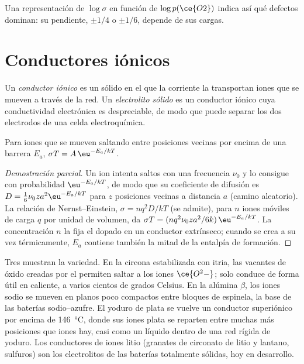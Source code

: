 Una representación de $\log\sigma$ en función de $\log p(\ce{O2})$ indica así qué defectos dominan: su pendiente,
$\pm 1/4$ o $\pm 1/6$, depende de sus cargas.

\section{Conductores iónicos}

\begin{definition}\label{def:b3:solid-state:ionic-conductor}
Un \emph{conductor iónico} es un sólido en el que la corriente
la transportan iones que se mueven a través de la red. Un \emph{electrolito
sólido} es un conductor iónico cuya conductividad electrónica
es despreciable, de modo que puede separar los dos electrodos de una
celda electroquímica.
\end{definition}

\begin{proposition}\label{prop:b3:solid-state:ionic-arrhenius}
Para iones que se mueven saltando entre posiciones vecinas por encima de una barrera $E_a$,
$\sigma T = A\,\eu^{-E_a/kT}$.
\end{proposition}

\begin{proof}[Demostración parcial]
Un ion intenta saltos con una frecuencia $\nu_0$ y lo consigue con probabilidad $\eu^{-E_a/kT}$,
de modo que su coeficiente de difusión es $D = \tfrac16\nu_0 z a^2\eu^{-E_a/kT}$ para $z$ posiciones vecinas a
distancia $a$ (camino aleatorio). La relación de Nernst--Einstein, $\sigma = nq^2D/kT$ (se admite), para $n$
iones móviles de carga $q$ por unidad de volumen, da $\sigma T = (nq^2\nu_0za^2/6k)\,\eu^{-E_a/kT}$. La
concentración $n$ la fija el dopado en un conductor extrínseco; cuando
se crea a su vez térmicamente, $E_a$ contiene también la mitad de la entalpía de formación.
\end{proof}

Tres  muestran la variedad. En la circona estabilizada con itria, las
vacantes de óxido creadas por el  permiten saltar a los iones $\ce{O^2-}$; solo conduce de forma útil
en caliente, a varios cientos de grados Celsius. En la alúmina $\beta$, los iones sodio se mueven en
planos poco compactos entre bloques de espinela, la base de las baterías
sodio--azufre. El yoduro de plata se vuelve un conductor superiónico por encima de \qty{146}{\celsius},
donde sus iones plata se reparten entre muchas más posiciones que iones hay,
casi como un líquido dentro de una red rígida de yoduro. Los conductores de iones litio
(granates de circonato de litio y lantano, sulfuros) son los electrolitos de las
baterías totalmente sólidas, hoy en desarrollo.

